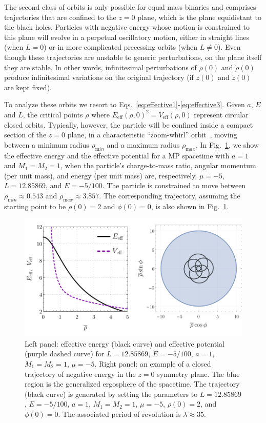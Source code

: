 The second class of orbits is only possible for equal mass binaries and comprises trajectories that are confined to the $z=0$ plane, which is the plane equidistant to the black holes. Particles with negative energy whose motion is constrained to this plane will evolve in a perpetual oscillatory motion, either in straight lines (when $L=0$) or in more complicated precessing orbits (when $L \neq 0$). Even though these trajectories are unstable to generic perturbations, on the plane itself they are stable. In other words, infinitesimal perturbations of $\rho(0)$ and $\dot \rho(0)$ produce infinitesimal variations on the original trajectory (if $z(0)$ and $\dot z(0)$ are kept fixed).

To analyze these orbits we resort to Eqs.~\eqref{eq:effective1}-\eqref{eq:effective3}. Given $a$, $E$ and $L$, the critical points $\rho$ where $E_{\mathrm{eff}}(\rho,0)^2 = V_{\mathrm{eff}}(\rho,0)$ represent circular closed orbits. Typically, however, the particle will be confined inside a compact section of the $z=0$ plane, in a characteristic ``zoom-whirl'' orbit~\cite{ASSUMPCAO2018,Levin:2008mq}, moving between a minimum radius $\rho_{\mathrm min}$ and a maximum radius $\rho_{\mathrm max}$. In Fig.~\ref{fig:orbit_closed_z}, we show the effective energy and the effective potential for a MP spacetime with $a=1$ and $M_1 = M_2 = 1$, when the particle's charge-to-mass ratio, angular momentum (per unit mass), and energy (per unit mass) are, respectively, $\mu=-5$, $L=12.85869$, and $E=-5/100$. The particle is constrained to move between $\rho_{\mathrm min}\approx 0.543$ and $\rho_{\mathrm max}\approx 3.857$. The corresponding trajectory, assuming the starting point to be $\rho(0)=2$ and $\phi(0)=0$, is also shown in Fig.~\ref{fig:orbit_closed_z}.

\begin{figure}[!ht]
  \centering
  \includegraphics[width=\linewidth]{img/penrose_binaries/fig5.pdf}
  \caption{Left panel: effective energy (black curve) and effective potential (purple dashed curve) for $L=12.85869$, $E=-5/100$, $a=1$, $M_1 = M_2 = 1$, $\mu = -5$. Right panel: an example of a closed trajectory of negative energy in the $z = 0$ symmetry plane. The blue region is the generalized ergosphere of the spacetime. The trajectory (black curve) is generated by setting the parameters to $L=12.85869$, $E=-5/100$, $a=1$, $M_1 = M_2 = 1$, $\mu = -5$, $\rho(0) = 2$, and $\phi(0) = 0$. The associated period of revolution is $\lambda \approx 35$.}
  \label{fig:orbit_closed_z}
\end{figure}

